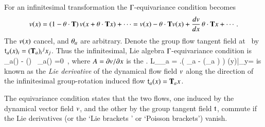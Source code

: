 % 
For an infinitesimal transformation 
the $\Gamma$-equivariance condition 
becomes
\[
v(x) =(1-{\bf \theta} \cdot \mathbf{T}) \, v(x+{\bf \theta} \cdot \mathbf{T} x) + \cdots
       =v(x)- {\bf \theta} \cdot \mathbf{T} v(x)
             + \frac{dv}{dx} \,{\bf \theta} \cdot \mathbf{T} x + \cdots
\,.
\]
The $v(x)$ cancel, and ${\bf \theta}_a$ are arbitrary. Denote
the group flow tangent field at \ssp\ by
$\mathfrak{t}_a(x)_{i}= (\mathbf{T}_a){}_{i}{}^j x_j$. Thus the
infinitesimal, Lie algebra $\Gamma$-equivariance condition is
\beq
  \groupTan_a(\vel)  - \Mvar(\ssp) \, \groupTan_a(\ssp) =0
  \,,
where $A = {\partial v}/{\partial x}$ is the \stabmat. 
\beq
{\cal L}_{\groupTan_a} \vel =
\left.\left(
  \Lg_a - (\Lg_a \ssp)
 \right) \vel(y)\right|_{y=\ssp}
is known as the {\em Lie derivative} of the dynamical flow
field $v$ along the direction of the infinitesimal
group-rotation induced flow $\mathfrak{t}_a(x)= \mathbf{T}_a x$.

The equivariance condition  states that the two
flows, one induced by the dynamical vector field $v$, and
the other by the group tangent field $\mathfrak{t}$, commute if
the Lie derivatives (or the `Lie brackets ' or `Poisson
brackets') vanish.
% 

